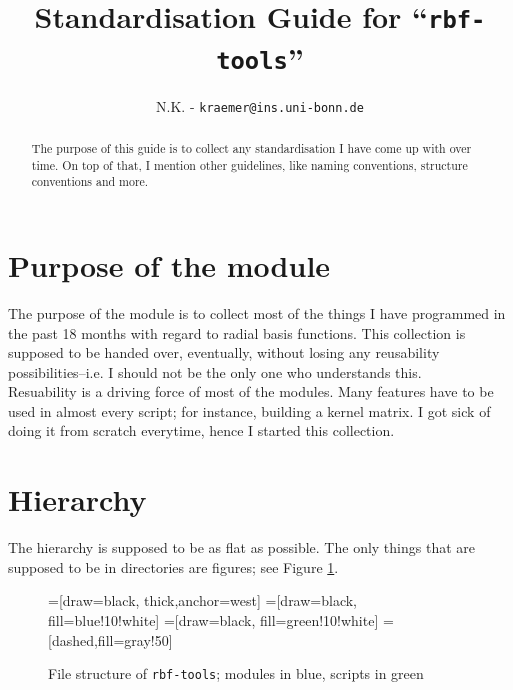 \documentclass[12pt]{article}
\title{Standardisation Guide for ``\texttt{rbf-tools}''}
\author{N.K. - \texttt{kraemer@ins.uni-bonn.de}}
\begin{document}
\maketitle
\begin{abstract}
The purpose of this guide is to collect any standardisation I have come up with over time. On top of that, I mention other guidelines, like naming conventions, structure conventions and more. 
\end{abstract}
\begin{figure}[h]
\centering
\begin{minipage}{0.5\textwidth}
\tableofcontents
\end{minipage}
\end{figure}




\section{Purpose of the module}

The purpose of the module is to collect most of the things I have programmed in the past 18 months with regard to radial basis functions. This collection is supposed to be handed over, eventually, without losing any reusability possibilities--i.e. I should not be the only one who understands this.\\

Resuability is a driving force of most of the modules. Many features have to be used in almost every script; for instance, building a kernel matrix. I got sick of doing it from scratch everytime, hence I started this collection.


\section{Hierarchy}
The hierarchy is supposed to be as flat as possible. The only things that are supposed to be in directories are figures; see Figure \ref{fig:hierarchy}.

\begin{figure}[h]
\centering
{}=[draw=black, thick,anchor=west]
=[draw=black, fill=blue!10!white]
=[draw=black, fill=green!10!white]
=[dashed,fill=gray!50]
\caption{File structure of \texttt{rbf-tools}; modules in blue, scripts in green}
\label{fig:hierarchy}
\end{figure}
\end{document}
